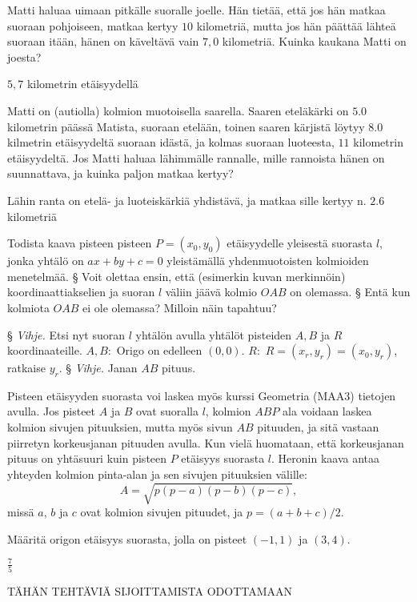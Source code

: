 \begin{tehtavasivu}
\begin{tehtava}
Matti haluaa uimaan pitkälle suoralle joelle. Hän tietää, että jos hän matkaa suoraan pohjoiseen, matkaa kertyy $10$ kilometriä, mutta jos hän päättää lähteä suoraan itään, hänen on käveltävä vain $7,0$ kilometriä. Kuinka kaukana Matti on joesta?
\begin{vastaus}
$5,7$ kilometrin etäisyydellä
\end{vastaus}
\end{tehtava}

\begin{tehtava}
Matti on (autiolla) kolmion muotoisella saarella. Saaren eteläkärki on $5.0$ kilometrin päässä Matista, suoraan etelään, toinen saaren kärjistä löytyy $8.0$ kilmetrin etäisyydeltä suoraan idästä, ja kolmas suoraan luoteesta, $11$ kilometrin etäisyydeltä. Jos Matti haluaa lähimmälle rannalle, mille rannoista hänen on suunnattava, ja kuinka paljon matkaa kertyy?
\begin{vastaus}
Lähin ranta on etelä- ja luoteiskärkiä yhdistävä, ja matkaa sille kertyy n. $2.6$ kilometriä
\end{vastaus}
\end{tehtava}

\begin{tehtava}
  Todista kaava pisteen pisteen $P=(x_0,y_0)$ etäisyydelle yleisestä suorasta $l$, jonka yhtälö on $ax + by +c = 0$ yleistämällä yhdenmuotoisten kolmioiden menetelmää.
  \alakohdat
      § Voit olettaa ensin, että (esimerkin kuvan merkinnöin) koordinaattiakselien ja suoran $l$ väliin jäävä kolmio $OAB$ on olemassa.
      § Entä kun kolmiota $OAB$ ei ole olemassa? Milloin näin tapahtuu?
  \loppu
  \begin{vastaus}
    \alakohdat
        § \emph{Vihje.} Etsi nyt suoran $l$ yhtälön avulla yhtälöt pisteiden $A, B$ ja $R$ koordinaateille. $A, B:$ Origo on edelleen $(0,0)$. $R:$ $R = (x_r, y_r) = (x_0, y_r)$, ratkaise $y_r$.
        § \emph{Vihje.} Janan $AB$ pituus.
    \loppu
  \end{vastaus}
\end{tehtava}

\begin{tehtava}
	Pisteen etäisyyden suorasta voi laskea myös kurssi Geometria (MAA3) tietojen avulla. Jos pisteet $A$ ja $B$ ovat suoralla $l$, kolmion $ABP$ ala voidaan laskea kolmion sivujen pituuksien, mutta myös sivun $AB$ pituuden, ja sitä vastaan piirretyn korkeusjanan pituuden avulla. Kun vielä huomataan, että korkeusjanan pituus on yhtäsuuri kuin pisteen $P$ etäisyys suorasta $l$. Heronin kaava antaa yhteyden kolmion pinta-alan ja sen sivujen pituuksien välille:
	\[
	A = \sqrt{p(p-a)(p-b)(p-c)},
	\]
	missä $a$, $b$ ja $c$ ovat kolmion sivujen pituudet, ja $p = (a+b+c)/2$.
	
	Määritä origon etäisyys suorasta, jolla on pisteet $(-1,1)$ ja $(3,4)$.
	\begin{vastaus}
		$\frac{7}{5}$
	\end{vastaus}
\end{tehtava}


TÄHÄN TEHTÄVIÄ SIJOITTAMISTA ODOTTAMAAN

\end{tehtavasivu}
